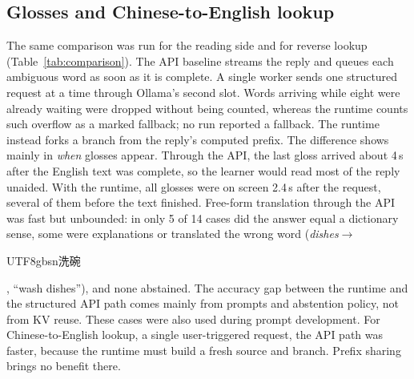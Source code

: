 \documentclass[11pt,a4paper]{article}
\newcommand{\zh}[1]{\begin{CJK}{UTF8}{gbsn}#1\end{CJK}}
\begin{document}
\subsection{Glosses and Chinese-to-English lookup}
The same comparison was run for the reading side and for reverse lookup (Table~\ref{tab:comparison}). The API baseline streams the reply and queues each ambiguous word as soon as it is complete. A single worker sends one structured request at a time through Ollama's second slot. Words arriving while eight were already waiting were dropped without being counted, whereas the runtime counts such overflow as a marked fallback; no run reported a fallback. The runtime instead forks a branch from the reply's computed prefix. The difference shows mainly in \emph{when} glosses appear. Through the API, the last gloss arrived about 4\,s after the English text was complete, so the learner would read most of the reply unaided. With the runtime, all glosses were on screen 2.4\,s after the request, several of them before the text finished. Free-form translation through the API was fast but unbounded: in only 5 of 14 cases did the answer equal a dictionary sense, some were explanations or translated the wrong word (\emph{dishes}$\to$\zh{洗碗}, ``wash dishes''), and none abstained. The accuracy gap between the runtime and the structured API path comes mainly from prompts and abstention policy, not from KV reuse. These cases were also used during prompt development. For Chinese-to-English lookup, a single user-triggered request, the API path was faster, because the runtime must build a fresh source and branch. Prefix sharing brings no benefit there.
\end{document}
